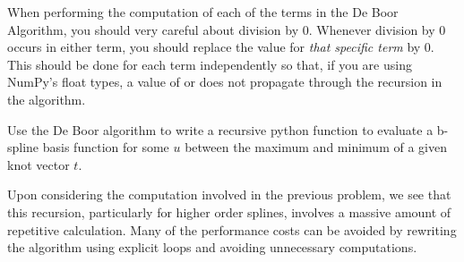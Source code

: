 \begin{warn}
When performing the computation of each of the terms in the De Boor Algorithm, you should very careful about division by $0$.
Whenever division by $0$ occurs in either term, you should replace the value for \emph{that specific term} by $0$.
This should be done for each term independently so that, if you are using NumPy's float types, a value of  or  does not propagate through the recursion in the algorithm.
\end{warn}

\begin{problem}
Use the De Boor algorithm to write a recursive python function to evaluate a b-spline basis function for some $u$ between the maximum and minimum of a given knot vector $t$.
\end{problem}

Upon considering the computation involved in the previous problem, we see that this recursion, particularly for higher order splines, involves a massive amount of repetitive calculation.
Many of the performance costs can be avoided by rewriting the algorithm using explicit loops and avoiding unnecessary computations.

